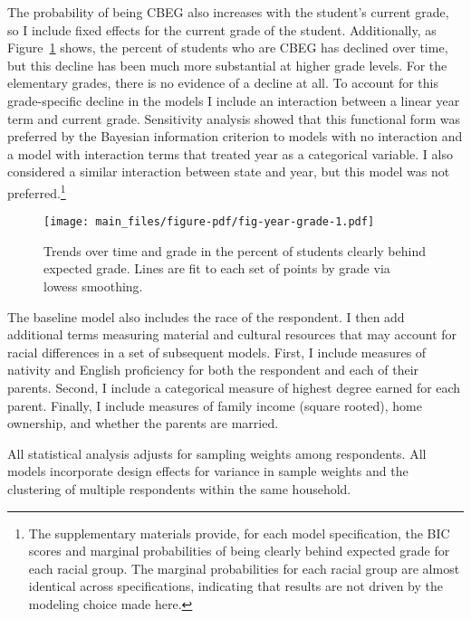 \documentclass[
  letterpaper,
  DIV=11,
  numbers=noendperiod]{scrartcl}
\begin{document}
The probability of being CBEG also increases with the student's current
grade, so I include fixed effects for the current grade of the student.
Additionally, as Figure~\ref{fig-year-grade} shows, the percent of
students who are CBEG has declined over time, but this decline has been
much more substantial at higher grade levels. For the elementary grades,
there is no evidence of a decline at all. To account for this
grade-specific decline in the models I include an interaction between a
linear year term and current grade. Sensitivity analysis showed that
this functional form was preferred by the Bayesian information criterion
to models with no interaction and a model with interaction terms that
treated year as a categorical variable. I also considered a similar
interaction between state and year, but this model was not
preferred.\footnote{The supplementary materials provide, for each model
  specification, the BIC scores and marginal probabilities of being
  clearly behind expected grade for each racial group. The marginal
  probabilities for each racial group are almost identical across
  specifications, indicating that results are not driven by the modeling
  choice made here.}

\begin{figure}[t]

{\centering \texttt{[image: main\_files/figure-pdf/fig-year-grade-1.pdf]}

}

\caption{\label{fig-year-grade}Trends over time and grade in the percent
of students clearly behind expected grade. Lines are fit to each set of
points by grade via lowess smoothing.}

\end{figure}

The baseline model also includes the race of the respondent. I then add
additional terms measuring material and cultural resources that may
account for racial differences in a set of subsequent models. First, I
include measures of nativity and English proficiency for both the
respondent and each of their parents. Second, I include a categorical
measure of highest degree earned for each parent. Finally, I include
measures of family income (square rooted), home ownership, and whether
the parents are married.

All statistical analysis adjusts for sampling weights among respondents.
All models incorporate design effects for variance in sample weights and
the clustering of multiple respondents within the same household.
\end{document}
